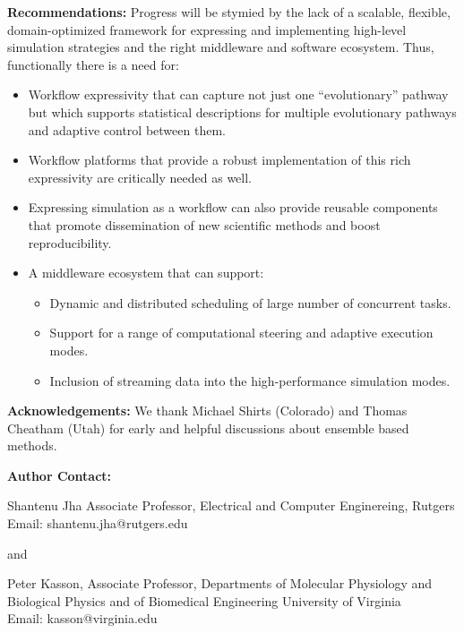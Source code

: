 \documentclass[10pt,letterpaper,draft]{article}
\begin{document}
{\bf Recommendations:} Progress will be stymied by the lack of a scalable, flexible, domain-optimized framework for expressing and implementing high-level simulation strategies and the right middleware and software ecosystem. Thus, functionally there is a need for:
\begin{itemize}
\item Workflow expressivity that can capture not just one “evolutionary” pathway but which supports statistical descriptions for multiple evolutionary pathways and adaptive control between them. 
\item Workflow platforms that provide a robust implementation of this rich expressivity are critically needed as well.
\item Expressing simulation as a workflow can also provide reusable components that promote dissemination of new scientific methods and boost reproducibility.
\item A middleware ecosystem that can support:
\begin{itemize} 
\item Dynamic and distributed scheduling of large number of concurrent tasks.
\item Support for a range of computational steering and adaptive execution modes.
\item Inclusion of streaming data into  the high-performance simulation modes.
\end{itemize}
\end{itemize}

{\bf Acknowledgements:} We thank Michael Shirts (Colorado) and Thomas Cheatham (Utah) for early and helpful discussions about ensemble based methods.

{\bf Author Contact:}

Shantenu Jha
Associate Professor,
Electrical and Computer Enginereing,
Rutgers\\
Email: shantenu.jha@rutgers.edu   

and 

Peter Kasson, 
Associate Professor,
Departments of Molecular Physiology and Biological Physics
and of Biomedical Engineering
University of Virginia\\
Email: kasson@virginia.edu 




\setcounter{page}{1} \pagestyle{plain} 


\end{document}
